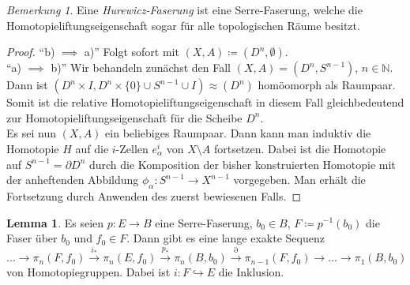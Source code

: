 \documentclass[11pt, a4paper, german]{article}
\theoremstyle{definition}
\newtheorem{lem}{Lemma}
\theoremstyle{remark}
\newtheorem*{bem}{Bemerkung}
\newcommand{\N}{\mathbb{N}} %
\newcommand{\ES}{Es sei} %
\newcommand{\ESn}{Es seien} %
\newcommand{\I}{I} %
\begin{document}
\begin{bem}
  Eine \emph{Hurewicz-Faserung} ist eine Serre-Faserung, welche die Homotopieliftungseigenschaft sogar für alle topologischen Räume besitzt.
\end{bem}

\begin{proof}
  "`b) $\implies$ a)"' \enspace Folgt sofort mit $(X, A) \coloneqq (D^n, \emptyset)$. \\[2pt]
  "`a) $\implies$ b)"' \enspace Wir behandeln zunächst den Fall $(X, A) = (D^n, S^{n-1})$, $n \in \N$. Dann ist $(D^n \times \I, D^n \times \{ 0 \} \cup S^{n-1} \cup \I) \approx (D^n)$ homöomorph als Raumpaar.
  Somit ist die relative Homotopieliftungseigenschaft in diesem Fall gleichbedeutend zur Homotopieliftungseigenschaft für die Scheibe $D^n$. \\
  \ES{} nun $(X, A)$ ein beliebiges Raumpaar.
  Dann kann man induktiv die Homotopie $H$ auf die $i$-Zellen $e^i_\alpha$ von $X \setminus A$ fortsetzen.
  Dabei ist die Homotopie auf $S^{n-1} = \partial D^n$ durch die Komposition der bisher konstruierten Homotopie mit der anheftenden Abbildung $\phi_\alpha : S^{n-1} \to X^{n-1}$ vorgegeben.
  Man erhält die Fortsetzung durch Anwenden des zuerst bewiesenen Falls.
\end{proof}

\begin{lem}
  \ESn{} $p : E \to B$ eine Serre-Faserung, $b_0 \in B$, $F \coloneqq p^{-1}(b_0)$ die Faser über $b_0$ und $f_0 \in F$.
  Dann gibt es eine lange exakte Sequenz
  \[ \ldots \to \pi_n(F, f_0) \xrightarrow{i_*} \pi_n(E, f_0) \xrightarrow{p_*} \pi_n(B, b_0) \xrightarrow{\partial} \pi_{n-1}(F, f_0) \to \ldots \to \pi_1(B, b_0) \]
  von Homotopiegruppen.
  Dabei ist $i : F \hookrightarrow E$ die Inklusion.
\end{lem}
\end{document}
